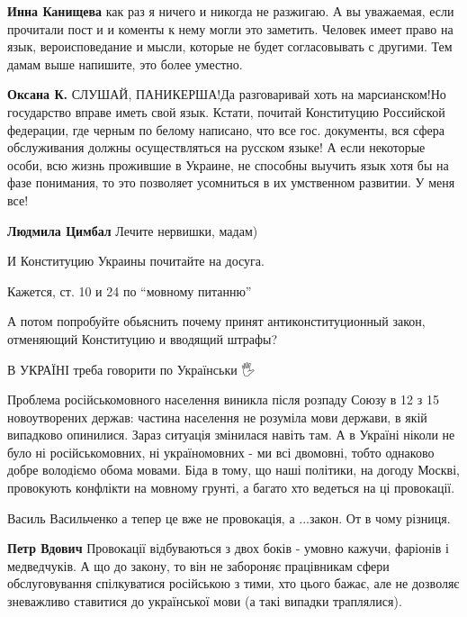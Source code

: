 \begin{itemize}
\begin{itemize}
\textbf{Инна Канищева} как раз я ничего и никогда не разжигаю. А вы уважаемая,
если прочитали пост и и коменты к нему могли это заметить. Человек имеет право
на язык, вероисповедание и мысли, которые не будет согласовывать с другими. Тем
дамам выше напишите, это более уместно.

\textbf{Оксана К.} СЛУШАЙ, ПАНИКЕРША!Да разговаривай хоть на марсианском!Но
государство вправе иметь свой язык. Кстати, почитай Конституцию Российской
федерации, где черным по белому написано, что все гос. документы, вся сфера
обслуживания должны осуществляться на русском языке! А если некоторые особи,
всю жизнь прожившие в Украине, не способны выучить язык хотя бы на фазе
понимания, то это позволяет усомниться в их умственном развитии. У меня все!

\textbf{Людмила Цимбал} Лечите нервишки, мадам)

И Конституцию Украины почитайте на досуга.

Кажется, ст. 10 и 24 по \enquote{мовному питанню}

А потом попробуйте обьяснить почему принят антиконституционный закон,
отменяющий Конституцию и вводящий штрафы?

\end{itemize}


В УКРАЇНІ треба говорити по Українськи 🖐️


Проблема російськомовного населення виникла після розпаду Союзу в 12 з 15
новоутворених держав: частина населення не розуміла мови держави, в якій
випадково опинилися. Зараз ситуація змінилася навіть там. А в Україні ніколи не
було ні російськомовних, ні україномовних - ми всі двомовні, тобто однаково
добре володіємо обома мовами. Біда в тому, що наші політики, на догоду Москві,
провокують конфлікти на мовному грунті, а багато хто ведеться на ці провокації.

\begin{itemize}
Василь Васильченко а тепер це вже не провокація, а ...закон.
От в чому різниця.


\textbf{Петр Вдович} Провокації відбуваються з двох боків - умовно кажучи,
фаріонів і медведчуків. А що до закону, то він не забороняє працівникам сфери
обслуговування спілкуватися російською з тими, хто цього бажає, але не дозволяє
зневажливо ставитися до української мови (а такі випадки траплялися).
\end{itemize}


\end{itemize}
